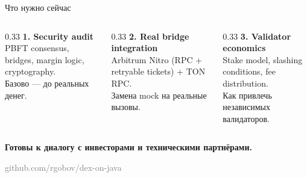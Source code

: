 \documentclass[aspectratio=169]{beamer}
\begin{document}
\begin{frame}{Что нужно сейчас}

\begin{columns}[t]
\begin{column}{0.33\textwidth}
\centering
\textbf{1. Security audit}\\[0.3em]
\small
PBFT consensus, bridges, margin logic, cryptography.\\
Базово --- до реальных денег.
\end{column}
\begin{column}{0.33\textwidth}
\centering
\textbf{2. Real bridge integration}\\[0.3em]
\small
Arbitrum Nitro (RPC + retryable tickets) + TON RPC.\\
Замена mock на реальные вызовы.
\end{column}
\begin{column}{0.33\textwidth}
\centering
\textbf{3. Validator economics}\\[0.3em]
\small
Stake model, slashing conditions, fee distribution.\\
Как привлечь независимых валидаторов.
\end{column}
\end{columns}

\vspace{1em}
\centering
\large\textbf{Готовы к диалогу с инвесторами и техническими партнёрами.}

\vspace{0.5em}
\small\textcolor{gray}{github.com/rgobov/dex-on-java}
\end{frame}
\end{document}
